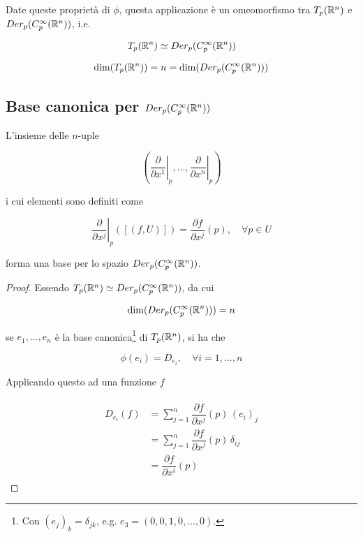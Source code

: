 Date queste proprietà di $ \phi $, questa applicazione è un omeomorfismo tra $ T_{p}(\mathbb{R}^{n}) $ e $ Der_{p}(C_{p}^{\infty}(\mathbb{R}^{n})) $, i.e.

\begin{equation}
	T_{p}(\mathbb{R}^{n}) \simeq Der_{p}(C_{p}^{\infty}(\mathbb{R}^{n}))
\end{equation}

\begin{corollary}
	\begin{equation}
		\dim ( T_{p}(\mathbb{R}^{n}) ) = n = \dim ( Der_{p}(C_{p}^{\infty}(\mathbb{R}^{n})) )
	\end{equation}
\end{corollary}

\subsection{Base canonica per $ Der_{p}(C_{p}^{\infty}(\mathbb{R}^{n})) $}

L'insieme delle $ n $-uple

\begin{equation}
	\left( \left. \dfrac{\partial}{\partial x^{1}} \right|_{p},\dots,\left. \dfrac{\partial}{\partial x^{n}} \right|_{p} \right)
\end{equation}

i cui elementi sono definiti come

\begin{equation}
	\left. \dfrac{\partial}{\partial x^{j}} \right|_{p} ([(f,U)]) = \dfrac{\partial f}{\partial x^{j}} (p), \quad \forall p \in U
\end{equation}

forma una base per lo spazio $ Der_{p}(C_{p}^{\infty}(\mathbb{R}^{n})) $.

\begin{proof}
	Essendo $ T_{p}(\mathbb{R}^{n}) \simeq Der_{p}(C_{p}^{\infty}(\mathbb{R}^{n})) $, da cui
	
	\begin{equation}
		\dim ( Der_{p}(C_{p}^{\infty}(\mathbb{R}^{n})) ) = n
	\end{equation}
		
	se $ e_{1},\dots,e_{n} $ è la base canonica\footnote{%
		Con $ (e_{j})_{k} = \delta_{jk} $, e.g. $ e_{3} = (0,0,1,0,\dots,0) $.%
	} di $ T_{p}(\mathbb{R}^{n}) $, si ha che

	\begin{equation}
		\phi(e_{i}) = D_{e_{i}}, \quad \forall i=1,\dots,n
	\end{equation}

	Applicando questo ad una funzione $ f $
	
	\begin{align}
		\begin{split}
			D_{e_{i}} (f) &= \sum_{j=1}^{n} \dfrac{\partial f}{\partial x^{j}} (p) \, (e_{i})_{j}\\
			&= \sum_{j=1}^{n} \dfrac{\partial f}{\partial x^{j}} (p) \, \delta_{ij}\\
			&= \dfrac{\partial f}{\partial x^{i}} (p)
		\end{split}
	\end{align}
\end{proof}

